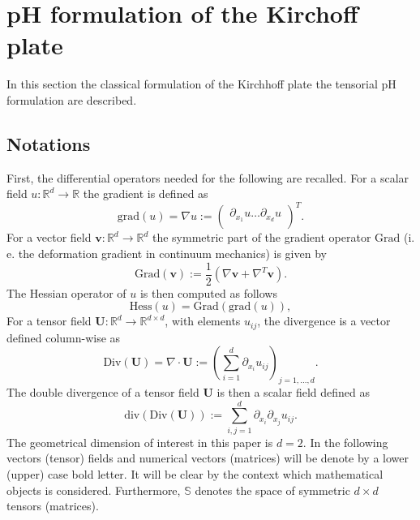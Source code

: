 \documentclass[letterpaper, 10 pt, conference]{ieeeconf}
\begin{document}
\section{pH formulation of the Kirchoff plate}
\label{sec:KirchhPH}

In this section the classical formulation of the Kirchhoff plate the tensorial pH formulation are described. 

\subsection{Notations}
First, the differential operators needed for the following are recalled. For a scalar field $u: \mathbb{R}^d \rightarrow \mathbb{R}$ the gradient is defined as 
\begin{equation*}
\mathrm{grad}(u) =  \nabla u := \begin{pmatrix}
\partial_{x_1} u \dots \partial_{x_d} u \\
\end{pmatrix}^T.
\end{equation*}
For a vector field $\bm{v}: \mathbb{R}^d \rightarrow \mathbb{R}^d$ the symmetric part of the gradient operator $\mathrm{Grad}$ (i. e. the deformation gradient in continuum mechanics) is given by
\begin{equation*}
\mathrm{Grad}(\bm{v}) := \frac{1}{2} \left(\nabla \bm{v} + \nabla^T \bm{v} \right).
\end{equation*}
The Hessian operator of $u$ is then computed as follows
\begin{equation*}
\mathrm{Hess}(u) = \mathrm{Grad}(\mathrm{grad}(u)),
\end{equation*}
For a tensor field $\bm{U}: \mathbb{R}^d \rightarrow \mathbb{R}^{d \times d}$, with elements $u_{ij}$, the divergence is a vector defined column-wise as
\begin{equation*}
\mathrm{Div}(\bm U) = \nabla \cdot \bm{U} := \left( \sum_{i = 1}^d \partial_{x_i} u_{ij} \right)_{j = 1, \dots, d}.
\end{equation*}
The double divergence of a tensor field $\bm{U}$ is then a scalar field defined as
\begin{equation*}
\mathrm{div}(\mathrm{Div}(\bm U)):= \sum_{i, j = 1}^d \partial_{x_i} \partial_{x_j} u_{ij} .
\end{equation*}
The geometrical dimension of interest in this paper is $d=2$. In the following vectors (tensor) fields and numerical vectors (matrices) will be denote by a lower (upper) case bold letter. It will be clear by the context which mathematical objects is considered. Furthermore, $\mathbb{S}$ denotes the space of symmetric $d \times d$ tensors (matrices).
\end{document}
